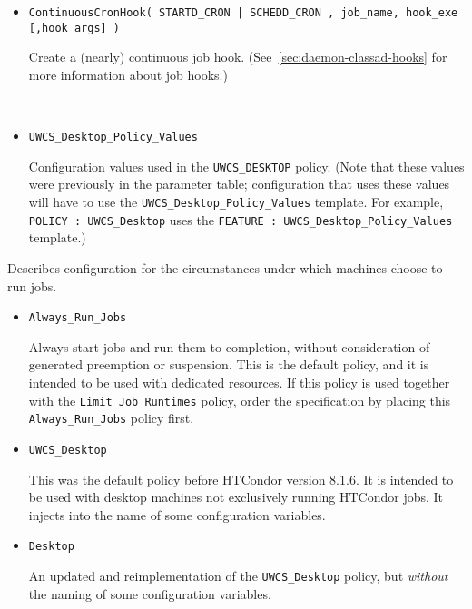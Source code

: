 \begin{description}
\begin{itemize}
    \item \texttt{ContinuousCronHook( STARTD\_CRON | SCHEDD\_CRON ,
	job\_name, hook\_exe [,hook\_args] )}

	Create a (nearly) continuous job hook.
	(See~\ref{sec:daemon-classad-hooks} for more information about job hooks.)

\
    \item \texttt{UWCS\_Desktop\_Policy\_Values}

	Configuration values used in the \texttt{UWCS\_DESKTOP} policy.
	(Note that these values were previously in the parameter table;
	configuration that uses these values will have to use the
	\texttt{UWCS\_Desktop\_Policy\_Values} template.  For example,
	\texttt{POLICY : UWCS\_Desktop} uses the
	\texttt{FEATURE : UWCS\_Desktop\_Policy\_Values} template.)
  \end{itemize}

\label{usecategory:POLICY}
\item[\MacroNI{POLICY category}]
  Describes configuration for the circumstances under which
  machines choose to run jobs.
  \begin{itemize}

    \item \texttt{Always\_Run\_Jobs}

    Always start jobs and run them to completion, without consideration of
    \Condor{negotiator} generated preemption or suspension.
    This is the default policy, and it is intended to be used with dedicated
    resources.
    If this policy is used together with the \texttt{Limit\_Job\_Runtimes}
    policy,
    order the specification by placing this \texttt{Always\_Run\_Jobs}
    policy first.

    \item \texttt{UWCS\_Desktop}

    This was the default policy before HTCondor version 8.1.6.
    It is intended to be used with desktop machines not exclusively running
    HTCondor jobs.
    It injects  into the name of some configuration variables.

    \item \texttt{Desktop}

    An updated and reimplementation of the \texttt{UWCS\_Desktop} policy,
    but \emph{without} the \Expr{UWCS} naming of some configuration variables.


\end{itemize}
\end{description}
